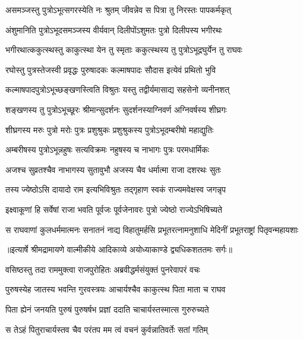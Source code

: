 \twolineshloka
{असमञ्जस्तु पुत्रोऽभूत्सगरस्येति नः श्रुतम्}
{जीवन्नेव स पित्रा तु निरस्तः पापकर्मकृत्} %

\twolineshloka
{अंशुमानिति पुत्रोऽभूदसमञ्जस्य वीर्यवान्}
{दिलीपोंऽशुमतः पुत्रो दिलीपस्य भगीरथः} %

\twolineshloka
{भगीरथात्ककुत्स्थस्तु काकुत्स्था येन तु स्मृताः}
{ककुत्स्थस्य तु पुत्रोऽभूद्रघुर्येन तु राघवः} %

\twolineshloka
{रघोस्तु पुत्रस्तेजस्वी प्रवृद्धः पुरुषादकः}
{कल्माषपादः सौदास इत्येवं प्रथितो भुवि} %

\twolineshloka
{कल्माषपादपुत्रोऽभूच्छङ्खणस्त्विति विश्रुतः}
{यस्तु तद्वीर्यमासाद्य सहसेनो व्यनीनशत्} %

\twolineshloka
{शङ्खणस्य तु पुत्रोऽभूच्छूरः श्रीमान्सुदर्शनः}
{सुदर्शनस्याग्निवर्ण अग्निवर्षस्य शीघ्रगः} %

\twolineshloka
{शीघ्रगस्य मरुः पुत्रो मरोः पुत्रः प्रशुश्रुकः}
{प्रशुश्रुकस्य पुत्रोऽभूदम्बरीषो महाद्युतिः} %

\twolineshloka
{अम्बरीषस्य पुत्रोऽभून्नहुषः सत्यविक्रमः}
{नहुषस्य च नाभागः पुत्रः परमधार्मिकः} %

\twolineshloka
{अजश्च सुव्रतश्चैव नाभागस्य सुतावुभौ}
{अजस्य चैव धर्मात्मा राजा दशरथः सुतः} %

\twolineshloka
{तस्य ज्येष्ठोऽसि दायादो राम इत्यभिविश्रुतः}
{तद्गृहाण स्वकं राज्यमवेक्षस्व जगन्नृप} %

\twolineshloka
{इक्ष्वाकूणां हि सर्वेषां राजा भवति पूर्वजः}
{पूर्वजेनावरः पुत्रो ज्येष्ठो राज्येऽभिषिच्यते} %

\fourlineindentedshloka
{स राघवाणां कुलधर्ममात्मनः}
{ सनातनं नाद्य विहातुमर्हसि}
{प्रभूतरत्नामनुशाधि मेदिनीं}
{ प्रभूतराष्ट्रां पितृवन्महायशाः} %


{॥इत्यार्षे श्रीमद्रामायणे वाल्मीकीये आदिकाव्ये अयोध्याकाण्डे द्व्यधिकशततमः सर्गः॥}


\twolineshloka
{वसिष्ठस्तु तदा राममुक्त्वा राजपुरोहितः}
{अब्रवीद्धर्मसंयुक्तं पुनरेवापरं वचः} %

\twolineshloka
{पुरुषस्येह जातस्य भवन्ति गुरवस्त्रयः}
{आचार्यश्चैव काकुत्स्थ पिता माता च राघव} %

\twolineshloka
{पिता ह्येनं जनयति पुरुषं पुरुषर्षभ}
{प्रज्ञां ददाति चाचार्यस्तस्मात्स गुरुरुच्यते} %

\twolineshloka
{स तेऽहं पितुराचार्यस्तव चैव परंतप}
{मम त्वं वचनं कुर्वन्नातिवर्तेः सतां गतिम्} %

